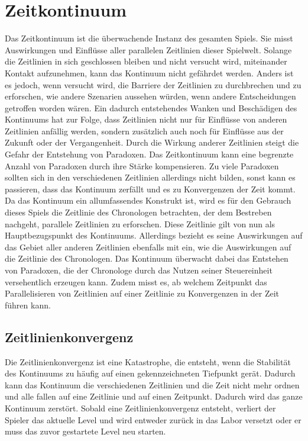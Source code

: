 \section{Zeitkontinuum}
Das Zeitkontinuum ist die überwachende Instanz des gesamten Spiels. Sie misst Auswirkungen und Einflüsse aller parallelen Zeitlinien dieser Spielwelt. Solange die Zeitlinien in sich geschlossen bleiben und nicht versucht wird, miteinander Kontakt aufzunehmen, kann das Kontinuum nicht gefährdet werden. Anders ist es jedoch, wenn versucht wird, die Barriere der Zeitlinien zu durchbrechen und zu erforschen, wie andere Szenarien aussehen würden, wenn andere Entscheidungen getroffen worden wären. Ein dadurch entstehendes Wanken und Beschädigen des Kontinuums hat zur Folge, dass Zeitlinien nicht nur für Einflüsse von anderen Zeitlinien anfällig werden, sondern zusätzlich auch noch für Einflüsse aus der Zukunft oder der Vergangenheit. Durch die Wirkung anderer Zeitlinien steigt die Gefahr der Entstehung von Paradoxen. Das Zeitkontinuum kann eine begrenzte Anzahl von Paradoxen durch ihre Stärke kompensieren. Zu viele Paradoxen sollten sich in den verschiedenen Zeitlinien allerdings nicht bilden, sonst kann es passieren, dass das Kontinuum zerfällt und es zu Konvergenzen der Zeit kommt. Da das Kontinuum ein allumfassendes Konstrukt ist, wird es für den Gebrauch dieses Spiels die Zeitlinie des Chronologen betrachten, der dem Bestreben nachgeht, parallele Zeitlinien zu erforschen. Diese Zeitlinie gilt von nun als Hauptbezugspunkt des Kontinuums. Allerdings bezieht es seine Auswirkungen auf das Gebiet aller anderen Zeitlinien ebenfalls mit ein, wie die Auswirkungen auf die Zeitlinie des Chronologen. Das Kontinuum überwacht dabei das Entstehen von Paradoxen, die der Chronologe durch das Nutzen seiner Steuereinheit versehentlich erzeugen kann. Zudem misst es, ab welchem Zeitpunkt das Parallelisieren von Zeitlinien auf einer Zeitlinie zu Konvergenzen in der Zeit führen kann.

\subsection{Zeitlinienkonvergenz}\label{sec:konvergenz}
Die Zeitlinienkonvergenz ist eine Katastrophe, die entsteht, wenn die Stabilität des Kontinuums zu häufig auf einen gekennzeichneten Tiefpunkt gerät. Dadurch kann das Kontinuum die verschiedenen Zeitlinien und die Zeit nicht mehr ordnen und alle fallen auf eine Zeitlinie und auf einen Zeitpunkt. Dadurch wird das ganze Kontinuum zerstört. Sobald eine Zeitlinienkonvergenz entsteht, verliert der Spieler das aktuelle Level und wird entweder zurück in das Labor versetzt oder er muss das zuvor gestartete Level neu starten.

